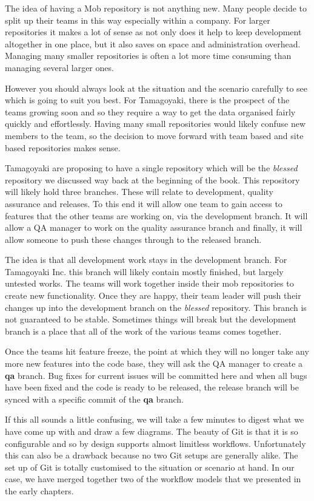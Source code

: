 The idea of having a Mob repository is not anything new.
Many people decide to split up their teams in this way especially within a company.
For larger repositories it makes a lot of sense as not only does it help to keep development altogether in one place, but it also saves on space and administration overhead.
Managing many smaller repositories is often a lot more time consuming than managing several larger ones.

However you should always look at the situation and the scenario carefully to see which is going to suit you best.
For Tamagoyaki, there is the prospect of the teams growing soon and so they require a way to get the data organised fairly quickly and effortlessly.
Having many small repositories would likely confuse new members to the team, so the decision to move forward with team based and site based repositories makes sense.

Tamagoyaki are proposing to have a single repository which will be the \emph{blessed} repository we discussed way back at the beginning of the book.
This repository will likely hold three branches.
These will relate to development, quality assurance and releases.
To this end it will allow one team to gain access to features that the other teams are working on, via the development branch.
It will allow a QA manager to work on the quality assurance branch and finally, it will allow someone to push these changes through to the released branch.

The idea is that all development work stays in the development branch.
For Tamagoyaki Inc.
this branch will likely contain mostly finished, but largely untested works.
The teams will work together inside their mob repositories to create new functionality.
Once they are happy, their team leader will push their changes up into the development branch on the \emph{blessed} repository.
This branch is not guaranteed to be stable.
Sometimes things will break but the development branch is a place that all of the work of the various teams comes together.

Once the teams hit feature freeze, the point at which they will no longer take any more new features into the code base, they will ask the QA manager to create a \textbf{qa} branch.
Bug fixes for current issues will be committed here and when all bugs have been fixed and the code is ready to be released, the release branch will be synced with a specific commit of the \textbf{qa} branch.

If this all sounds a little confusing, we will take a few minutes to digest what we have come up with and draw a few diagrams.
The beauty of Git is that it is so configurable and so by design supports almost limitless workflows.
Unfortunately this can also be a drawback because no two Git setups are generally alike.
The set up of Git is totally customised to the situation or scenario at hand.
In our case, we have merged together two of the workflow models that we presented in the early chapters.

